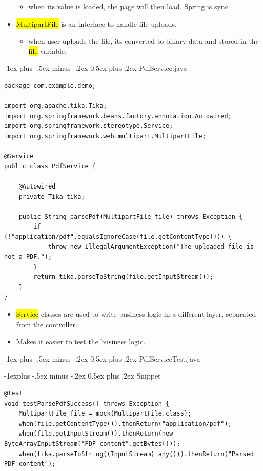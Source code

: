 \documentclass[10pt, landscape]{article}
\makeatletter
\renewcommand{\section}{\@startsection{section}{1}{0mm}%
  {-1ex plus -.5ex minus -.2ex}%
  {0.5ex plus .2ex}%
{\normalfont\large\bfseries}}
\renewcommand{\subsection}{\@startsection{subsection}{2}{0mm}%
  {-1explus -.5ex minus -.2ex}%
  {0.5ex plus .2ex}%
{\normalfont\normalsize\bfseries}}
\makeatother
\begin{document}
\begin{multicols*}{2}
\begin{itemize}
\begin{itemize}
                  \item when its value is loaded, the page will then load. Spring is sync
              \end{itemize}
        \item \hl{MultipartFile} is an interface to handle file uploads.
              \begin{itemize}
                  \item when user uploads the file, its converted to binary data and stored in the \hl{file} variable.
              \end{itemize}
    \end{itemize}

    \section{PdfService.java}
    \begin{verbatim}
package com.example.demo;

import org.apache.tika.Tika;
import org.springframework.beans.factory.annotation.Autowired;
import org.springframework.stereotype.Service;
import org.springframework.web.multipart.MultipartFile;

@Service
public class PdfService {

    @Autowired
    private Tika tika;

    public String parsePdf(MultipartFile file) throws Exception {
        if (!"application/pdf".equalsIgnoreCase(file.getContentType())) {
            throw new IllegalArgumentException("The uploaded file is not a PDF.");
        }
        return tika.parseToString(file.getInputStream());
    }
}
\end{verbatim}

    \begin{itemize}
        \item \hl{Service} classes are used to write business logic in a different layer, separated from the controller.
        \item Makes it easier to test the business logic.
    \end{itemize}


    \section{PdfServiceTest.java}

    \subsection{Snippet}
    \begin{verbatim}
@Test
void testParsePdfSuccess() throws Exception {
    MultipartFile file = mock(MultipartFile.class);
    when(file.getContentType()).thenReturn("application/pdf");
    when(file.getInputStream()).thenReturn(new ByteArrayInputStream("PDF content".getBytes()));
    when(tika.parseToString((InputStream) any())).thenReturn("Parsed PDF content");


\end{verbatim}
\end{multicols*}
\end{document}
